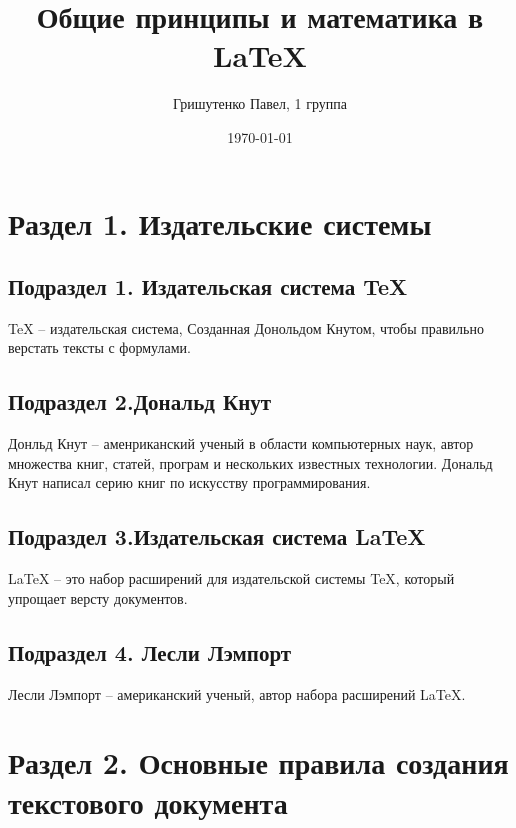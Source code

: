 \documentclass[a4paper,12pt]{article} %
\author{Гришутенко Павел, 1 группа}
\title{Общие принципы и математика в \LaTeX{}}
\date{\today}
\begin{document}

\maketitle

\section{Раздел 1. Издательские системы}
\subsection{Подраздел 1. Издательская система TeX}
TeX -- издательская система, Созданная Донольдом Кнутом, чтобы правильно верстать тексты с формулами.
\subsection{Подраздел 2.Дональд Кнут}
Донльд Кнут -- аменриканский ученый в области компьютерных наук, автор множества книг, статей, програм и нескольких известных технологии. Дональд Кнут написал серию книг по искусству программирования. 
\subsection{Подраздел 3.Издательская система LaTeX}
LaTeX -- это набор расширений для издательской системы TeX, который упрощает версту документов.
\subsection{Подраздел 4. Лесли Лэмпорт}
Лесли Лэмпорт -- американский ученый, автор набора расширений LaTeX.
\section{Раздел 2. Основные правила создания текстового документа}
\end{document}
